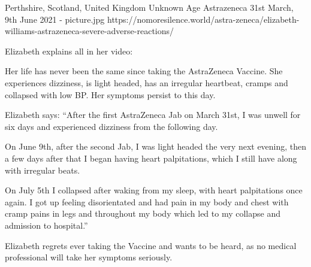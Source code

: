 {Perthshire, Scotland, United Kingdom}
{Unknown Age}
{Astrazeneca}
{31st March, 9th June 2021}
{-}
{picture.jpg}
{https://nomoresilence.world/astra-zeneca/elizabeth-williams-astrazeneca-severe-adverse-reactions/}
{


Elizabeth explains all in her video:

Her life has never been the same since taking the AstraZeneca Vaccine. She experiences dizziness, is light headed, has an irregular heartbeat, cramps and collapsed with low BP. Her symptoms persist to this day.

Elizabeth says: “After the first AstraZeneca Jab on March 31st, I was unwell for six days and experienced dizziness from the following day.

On June 9th, after the second Jab, I was light headed the very next evening, then a few days after that I began having heart palpitations, which I still have along with irregular beats.

On July 5th I collapsed after waking from my sleep, with heart palpitations once again. I got up feeling disorientated and had pain in my body and chest with cramp pains in legs and throughout my body which led to my collapse and admission to hospital.”

Elizabeth regrets ever taking the Vaccine and wants to be heard, as no medical professional will take her symptoms seriously.
}
